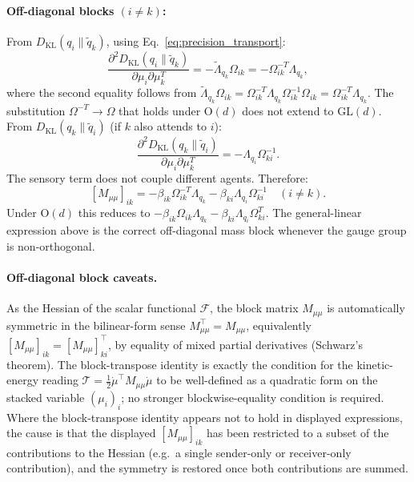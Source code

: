 \documentclass[11pt]{article}
\begin{document}
\paragraph{Off-diagonal blocks $(i \neq k)$:} From $D_{\mathrm{KL}}(q_i \| \tilde{q}_k)$, using Eq.~\eqref{eq:precision_transport}:
\begin{equation}
\frac{\partial^2 D_{\mathrm{KL}}(q_i \| \tilde{q}_k)}{\partial \mu_i \partial \mu_k^T} = -\tilde{\Lambda}_{q_k}\Omega_{ik} = -\Omega_{ik}^{-T}\Lambda_{q_k},
\end{equation}
where the second equality follows from $\tilde{\Lambda}_{q_k}\Omega_{ik} = \Omega_{ik}^{-T}\Lambda_{q_k}\Omega_{ik}^{-1}\Omega_{ik} = \Omega_{ik}^{-T}\Lambda_{q_k}$. The substitution $\Omega^{-T} \to \Omega$ that holds under $\mathrm{O}(d)$ does not extend to $\mathrm{GL}(d)$. From $D_{\mathrm{KL}}(q_k \| \tilde{q}_i)$ (if $k$ also attends to $i$):
\begin{equation}
\frac{\partial^2 D_{\mathrm{KL}}(q_k \| \tilde{q}_i)}{\partial \mu_i \partial \mu_k^T} = -\Lambda_{q_i}\Omega_{ki}^{-1}.
\end{equation}
The sensory term does not couple different agents. Therefore:
\begin{equation}
\boxed{[M_{\mu\mu}]_{ik} = -\beta_{ik}\Omega_{ik}^{-T}\Lambda_{q_k} - \beta_{ki}\Lambda_{q_i}\Omega_{ki}^{-1} \quad (i \neq k).}
\label{eq:mass_mu_offdiagonal}
\end{equation}
Under $\mathrm{O}(d)$ this reduces to $-\beta_{ik}\Omega_{ik}\Lambda_{q_k} - \beta_{ki}\Lambda_{q_i}\Omega_{ki}^T$. The general-linear expression above is the correct off-diagonal mass block whenever the gauge group is non-orthogonal.
\paragraph{Off-diagonal block caveats.}\label{sec:mass_block_caveats}
As the Hessian of the scalar functional $\mathcal{F}$, the block matrix $M_{\mu\mu}$ is automatically symmetric in the bilinear-form sense $M_{\mu\mu}^\top = M_{\mu\mu}$, equivalently $[M_{\mu\mu}]_{ik} = [M_{\mu\mu}]_{ki}^\top$, by equality of mixed partial derivatives (Schwarz's theorem). The block-transpose identity is exactly the condition for the kinetic-energy reading $\mathcal{T} = \tfrac12 \dot\mu^\top M_{\mu\mu} \dot\mu$ to be well-defined as a quadratic form on the stacked variable $(\mu_i)_i$; no stronger blockwise-equality condition is required. Where the block-transpose identity appears not to hold in displayed expressions, the cause is that the displayed $[M_{\mu\mu}]_{ik}$ has been restricted to a subset of the contributions to the Hessian (e.g.\ a single sender-only or receiver-only contribution), and the symmetry is restored once both contributions are summed.
\end{document}
